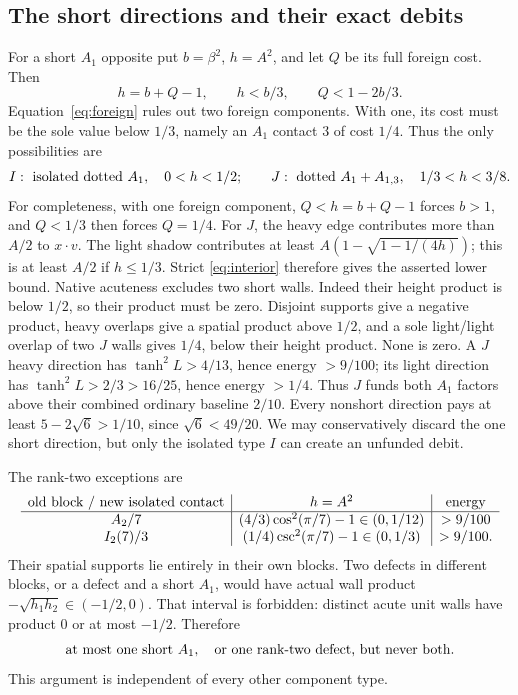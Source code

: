 \documentclass[11pt]{article}
\theoremstyle{remark}
\begin{document}
\subsection{The short directions and their exact debits}

For a short $A_1$ opposite put $b=\beta^2$, $h=A^2$, and let $Q$
be its full foreign cost. Then
\[
 h=b+Q-1,\qquad h<b/3,\qquad Q<1-2b/3.
\]
Equation~\eqref{eq:foreign} rules out two foreign components.
With one, its cost must be the sole value below $1/3$, namely an
$A_1$ contact $3$ of cost $1/4$. Thus the only possibilities are
\[
 I:\ \hbox{isolated dotted }A_1,\quad 0<h<1/2;
 \qquad
 J:\ \hbox{dotted }A_1+A_{1,3},\quad 1/3<h<3/8.
\]
For completeness, with one foreign component,
$Q<h=b+Q-1$ forces $b>1$, and $Q<1/3$ then forces $Q=1/4$.
For $J$, the heavy edge contributes more than $A/2$ to
$x\cdot v$. The light shadow contributes at least
$A(1-\sqrt{1-1/(4h)})$; this is at least $A/2$ if $h\le1/3$.
Strict \eqref{eq:interior} therefore gives the asserted lower bound.
Native acuteness excludes two short walls. Indeed their height
product is below $1/2$, so their product must be zero. Disjoint
supports give a negative product, heavy overlaps give a spatial
product above $1/2$, and a sole light/light overlap of two $J$ walls
gives $1/4$, below their height product. None is zero. A $J$ heavy
direction has $\tanh^2L>4/13$, hence energy $>9/100$; its light
direction has $\tanh^2L>2/3>16/25$, hence energy $>1/4$.
Thus $J$ funds both $A_1$ factors above their combined ordinary
baseline $2/10$. Every nonshort direction pays at least
$5-2\sqrt6>1/10$, since $\sqrt6<49/20$. We may conservatively
discard the one short direction, but only the isolated type $I$
can create an unfunded debit.

The rank-two exceptions are
\begin{equation}\label{eq:defects}
\begin{array}{c|c|c}
\hbox{old block / new isolated contact} & h=A^2 & \hbox{energy}\\ \hline
A_2/7 & (4/3)\cos^2(\pi/7)-1\in(0,1/12) & >9/100\\
I_2(7)/3 & (1/4)\csc^2(\pi/7)-1\in(0,1/3) & >9/100.
\end{array}
\end{equation}
Their spatial supports lie entirely in their own blocks.
Two defects in different blocks, or a defect and a short $A_1$,
would have actual wall product $-\sqrt{h_1h_2}\in(-1/2,0)$.
That interval is forbidden: distinct acute unit walls have product
$0$ or at most $-1/2$. Therefore
\begin{equation}\label{eq:debits}
\text{at most one short }A_1,\quad\hbox{or one rank-two defect,
but never both.}
\end{equation}
This argument is independent of every other component type.
\end{document}
